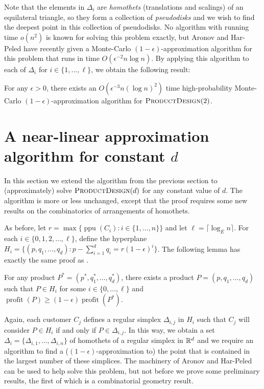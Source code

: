 \documentclass[lotsofwhite]{patmorin}
\newcommand{\ppu}{\operatorname{ppu}}
\newcommand{\val}{\operatorname{profit}}
\newcommand{\eps}{\epsilon}
\begin{document}
Note that the elements in $\Delta_i$ are \emph{homothets} (translations and
scalings) of an equilateral triangle, so they form a collection of
\emph{pseudodisks} and we wish to find the deepest point in this collection
of pseudodisks.  No algorithm with running time $o(n^2)$ is known for
solving this problem exactly, but Aronov and Har-Peled \cite{ah08} have
recently given a Monte-Carlo $(1-\eps)$-approximation algorithm for this
problem that runs in time $O(\eps^{-2}n\log n)$.  By applying this
algorithm to each of $\Delta_i$ for $i\in\{1,\ldots,\ell\}$, we obtain the
following result:

\begin{thm}
  For any $\eps >0$, there exists an $O(\eps^{-3}n(\log n)^2)$ time
  high-probability Monte-Carlo $(1-\eps)$-approximation algorithm for
  $\textsc{ProductDesign}(2)$.
\end{thm}

\section{A near-linear approximation algorithm for constant $d$}

In this section we extend the algorithm from the previous section to
(approximately) solve $\textsc{ProductDesign}(d)$ for any constant value of
$d$.  The algorithm is more or less unchanged, except that the proof
requires some new results on the combinatorics of arrangements of
homothets.

As before, let $r=\max\{\ppu(C_i) : i\in\{1,\ldots, n\}\}$ and let
$\ell = \lceil\log_E n\rceil$. For each $i\in\{0,1,2,\ldots,\ell\}$,
define the hyperplane $H_i = \{ (p,q_1,\ldots,q_d) : p-\sum_{i=1}^d
q_i =  r(1-\eps)^i \}$.  The following lemma has exactly the same proof
as .

\begin{lem}
  For any product $P^*=(p^*,q_1^*,\ldots,q_d^*)$, there exists
  a product $P=(p,q_1,\ldots,q_d)$ such that $P\in H_i$ for some
  $i\in\{0,\ldots,\ell\}$ and $\val(P) \ge (1-\eps)\val(P^*)$.
\end{lem}

Again, each customer $C_j$ defines a regular simplex $\Delta_{i,j}$
in $H_{i}$ such that $C_j$ will consider $P\in H_i$ if and
only if $P\in\Delta_{i,j}$.  In this way, we obtain a set
$\Delta_i=\{\Delta_{i,1},\ldots,\Delta_{i,n}\}$ of homothets of
a regular simplex in $\mathbb{R}^d$ and we require an algorithm to find a
($(1-\eps)$-approximation to) the point that is contained in the largest
number of these simplices.  The machinery of Aronov and Har-Peled
\cite{ah08} can be used to help solve this problem, but not before we
prove some preliminary results, the first of which is a combinatorial
geometry result.
\end{document}
